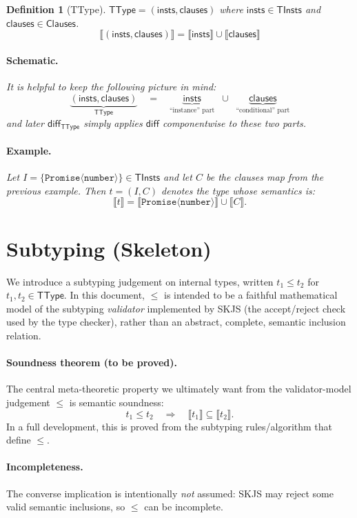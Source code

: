 \documentclass[11pt]{article}
\newtheorem{definition}[theorem]{Definition}
\newcommand{\sem}[1]{\llbracket #1 \rrbracket}
\newcommand{\diff}{\mathsf{diff}}
\newcommand{\TType}{\mathsf{TType}}
\newcommand{\Clauses}{\mathsf{Clauses}}
\newcommand{\TInsts}{\mathsf{TInsts}}
\newcommand{\insts}{\mathsf{insts}}
\newcommand{\clauses}{\mathsf{clauses}}
\begin{document}
\begin{definition}[TType]
\label{def:ttype}
$\TType = (\insts, \clauses)$ where $\insts \in \TInsts$ and $\clauses \in \Clauses$.
\[
\sem{(\insts, \clauses)} = \sem{\insts} \cup \sem{\clauses}
\]
\paragraph{Schematic.}
It is helpful to keep the following picture in mind:
\[
\underbrace{(\insts,\clauses)}_{\TType}
\quad=\quad
\underbrace{\insts}_{\text{``instance'' part}}
\;\;\cup\;\;
\underbrace{\clauses}_{\text{``conditional'' part}}
\]
and later $\diff_{\TType}$ simply applies $\diff$ componentwise to these two parts.
\paragraph{Example.}
Let $I = \{\texttt{Promise}\langle \texttt{number} \rangle\} \in \TInsts$ and let $C$ be the clauses map from the previous example.
Then $t = (I,C)$ denotes the type whose semantics is:
\[
\sem{t} = \sem{\texttt{Promise}\langle \texttt{number} \rangle} \cup \sem{C}.
\]
\end{definition}

\section{Subtyping (Skeleton)}
\label{sec:subtyping-skeleton}

We introduce a subtyping judgement on internal types,
written $t_1 \leq t_2$ for $t_1,t_2 \in \TType$.
In this document, $\leq$ is intended to be a faithful mathematical model of the
subtyping \emph{validator} implemented by SKJS (the accept/reject check used by the type checker),
rather than an abstract, complete, semantic inclusion relation.

\paragraph{Soundness theorem (to be proved).}
The central meta-theoretic property we ultimately want from the validator-model judgement $\leq$
is semantic soundness:
\[
t_1 \leq t_2 \quad\Longrightarrow\quad \sem{t_1} \subseteq \sem{t_2}.
\]
In a full development, this is proved from the subtyping rules/algorithm that define $\leq$.

\paragraph{Incompleteness.}
The converse implication is intentionally \emph{not} assumed: SKJS may reject some valid
semantic inclusions, so $\leq$ can be incomplete.
\end{document}

